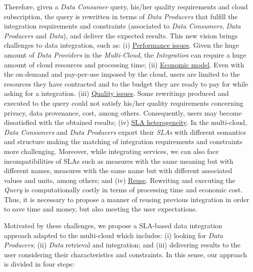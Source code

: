 Therefore, given a \textsl{Data Consumer} query, his/her quality requirements and cloud subscription, the query is rewritten in terms of \textsl{Data Producers} that fulfill the integration requirements and constraints (associated to \textsl{Data Consumers}, \textsl{Data Producers} and \textsl{Data}), and deliver the expected results. This new vision brings challenges to data integration, such as: (i) \underline{Performance issues}. Given the huge amount of \textsl{Data Providers} in the \textsl{Multi-Cloud}, the \textsl{Integration} can require a huge amount of cloud resources and processing time; (ii) \underline{Economic model}. Even with the on-demand and pay-per-use imposed by the cloud, users are limited to the resources they have contracted and to the budget they are ready to pay for while asking for a integration. %
(iii) \underline{Quality issues}. Some rewritings produced and executed to the query could not satisfy his/her quality requirements concerning privacy, data provenance, cost, among others. Consequently, users may become dissatisfied with the obtained results; (iv) \underline{SLA heterogeneity}. In the multi-cloud, \textsl{Data Consumers} and \textsl{Data Producers} export their \textsl{SLAs} with different semantics and structure making the matching of integration requirements  and constraints more challenging. Moreover, while integrating services, we can also face incompatibilities of SLAs such as measures with the same meaning but with different names, measures with the same name but with different associated values and units, among others; and (iv) \underline{Reuse}. Rewriting and executing the \textsl{Query} is computationally costly in terms of processing time and economic cost. Thus, it is necessary to propose a manner of reusing previous integration in order to save time and money, but also meeting the user expectations.

Motivated by these challenges, we propose a SLA-based data integration approach adapted to the multi-cloud which includes: (i) looking for \textsl{Data Producers}; (ii) \textsl{Data} retrieval and integration; and (iii) delivering results to the user considering their characteristics and constraints.  In this sense, our approach is divided in four steps:


